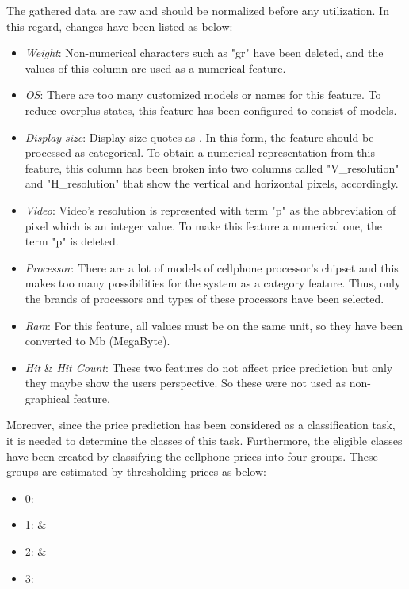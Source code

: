 \documentclass{svjour3}                     \smartqed  \usepackage{graphicx}
\begin{document}
The gathered data are raw and should be normalized before any utilization. In this regard, changes have been listed as below:
\begin{itemize}
    \item \textit{Weight}: Non-numerical characters such as "gr" have been deleted, and the values of this column are used as a numerical feature.
    \item \textit{OS}: There are too many customized models or names for this feature. To reduce overplus states, this feature has been configured to consist of  models.
    \item \textit{Display size}: Display size quotes as . In this form, the feature should be processed as categorical. To obtain a numerical representation from this feature, this column has been broken into two columns called "V\_resolution" and "H\_resolution" that show the vertical and horizontal pixels, accordingly.
    \item \textit{Video}:  Video's resolution is represented with term "p" as the abbreviation of pixel which is an integer value. To make this feature a numerical one, the term "p" is deleted.
    \item \textit{Processor}: There are a lot of models of cellphone processor's chipset and this makes too many possibilities for the system as a category feature. Thus, only the brands of processors and   types of these processors have been selected.
    \item \textit{Ram}: For this feature, all values must be on the same unit, so they have been converted to Mb (MegaByte).
    \item \textit{Hit} \& \textit{Hit Count}: These two features do not affect price prediction but only they maybe show the users perspective. So these were not used as non-graphical feature.
\end{itemize}

Moreover, since the price prediction has been considered as a classification task, it is needed to determine the classes of this task. Furthermore, the eligible classes have been created by classifying the cellphone prices into four groups. These groups are estimated by thresholding prices as below:
\begin{itemize}
    \item 0: 
    \item 1:  \& 
    \item 2:  \& 
    \item 3: 
\end{itemize}
\end{document}
